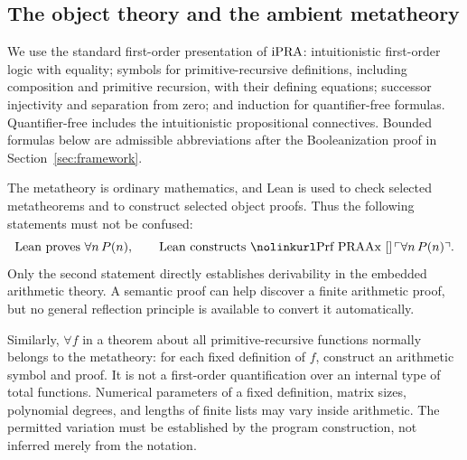 \subsection{The object theory and the ambient metatheory}

We use the standard first-order presentation of \(\mathrm{iPRA}\): intuitionistic
first-order logic with equality; symbols for primitive-recursive
definitions, including composition and primitive recursion, with their
defining equations; successor injectivity and separation from zero; and
induction for quantifier-free formulas. Quantifier-free includes the
intuitionistic propositional connectives. Bounded formulas below are
admissible abbreviations after the Booleanization proof in
Section~\ref{sec:framework}.

The metatheory is ordinary mathematics, and Lean is used to check selected
metatheorems and to construct selected object proofs. Thus the following
statements must not be confused:
\[
  \text{Lean proves }\forall n\,P(n),
  \qquad
  \text{Lean constructs }\code{Prf PRAAx []}\,\ulcorner\forall n\,P(n)\urcorner.
\]
Only the second statement directly establishes derivability in the
embedded arithmetic theory. A semantic proof can help discover a finite
arithmetic proof, but no general reflection principle is available to
convert it automatically.

Similarly, \(\forall f\) in a theorem about all primitive-recursive
functions normally belongs to the metatheory: for each fixed definition
of \(f\), construct an arithmetic symbol and proof. It is not a
first-order quantification over an internal type of total functions.
Numerical parameters of a fixed definition, matrix sizes, polynomial
degrees, and lengths of finite lists may vary inside arithmetic.
The permitted variation must be established by the program construction,
not inferred merely from the notation.
